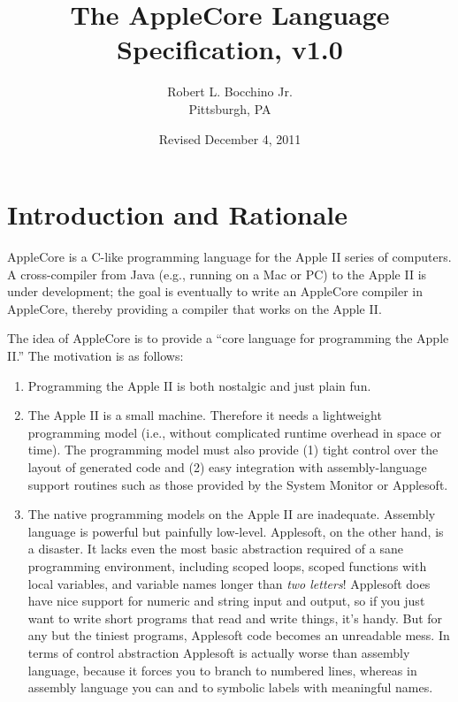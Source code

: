 \documentclass[10pt]{article}
\begin{document}
\title{\bfseries{The AppleCore Language Specification, v1.0}}
%
\author{Robert L. Bocchino Jr.\\
Pittsburgh, PA}
%
\date{Revised December 4, 2011}

\maketitle

\section{Introduction and Rationale}

AppleCore is a C-like programming language for the Apple II series of
computers.  A cross-compiler from Java (e.g., running on a Mac or PC)
to the Apple II is under development; the goal is eventually to write
an AppleCore compiler in AppleCore, thereby providing a compiler that
works on the Apple II.

The idea of AppleCore is to provide a ``core language for programming
the Apple II.''  The motivation is as follows:
%
\begin{enumerate}
%
\item Programming the Apple II is both nostalgic and just plain fun.
%
\item The Apple II is a small machine.  Therefore it needs a
  lightweight programming model (i.e., without complicated runtime
  overhead in space or time).  The programming model must also provide
  (1) tight control over the layout of generated code and (2) easy
  integration with assembly-language support routines such as those
  provided by the System Monitor or Applesoft.
%
\item The native programming models on the Apple II are inadequate.
  Assembly language is powerful but painfully low-level.  Applesoft,
  on the other hand, is a disaster.  It lacks even the most basic
  abstraction required of a sane programming environment, including
  scoped loops, scoped functions with local variables, and variable
  names longer than \emph{two letters}!  Applesoft does have nice
  support for numeric and string input and output, so if you just want
  to write short programs that read and write things, it's handy. But
  for any but the tiniest programs, Applesoft code becomes an
  unreadable mess.  In terms of control abstraction Applesoft is
  actually worse than assembly language, because it forces you to
  branch to numbered lines, whereas in assembly language you can
   and  to symbolic labels with meaningful names.
%
\end{enumerate}
\end{document}
